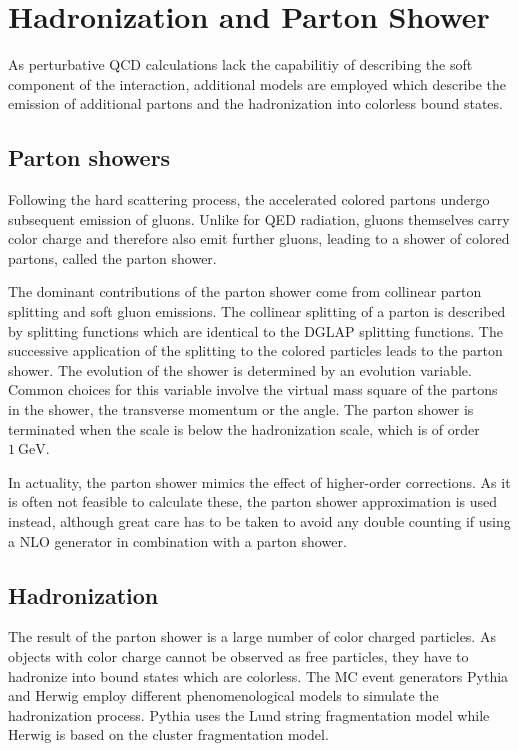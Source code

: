 \section{Hadronization and Parton Shower}

As perturbative QCD calculations lack the capabilitiy of describing the
soft component of the interaction, additional models are employed which describe
the emission of additional partons and the hadronization into colorless bound
states. 

\subsection{Parton showers}

Following the hard scattering process, the accelerated colored partons undergo
subsequent emission of gluons. Unlike for QED radiation, gluons themselves carry
color charge and therefore also emit further gluons, leading to a shower of
colored partons, called the parton shower.

The dominant contributions of the parton shower  come from collinear parton
splitting and soft gluon emissions. The collinear splitting of a parton is
described by splitting functions which are identical to the DGLAP splitting
functions. The successive application of the splitting to the colored particles
leads to the parton shower. The evolution of the shower is determined by an
evolution variable. Common choices for this variable  involve the virtual mass square of the
partons in the shower, the transverse momentum or the angle. The parton shower
is terminated when the scale is below the hadronization scale, which is of order
$\SI{1}{\GeV}$.

In actuality, the parton shower mimics the effect of higher-order corrections. As
it is often not feasible to calculate these, the parton shower approximation is
used instead, although great care has to be taken to avoid any double counting if
using a NLO generator in combination with a parton shower.

\subsection{Hadronization}

The result of the parton shower is a large number of color charged particles. As
objects with color charge cannot be observed as free particles, they have to
hadronize into bound states which are colorless. The MC event generators Pythia
and Herwig employ different phenomenological models to simulate the
hadronization process. Pythia uses the Lund string fragmentation model while
Herwig is based on the cluster fragmentation model.

